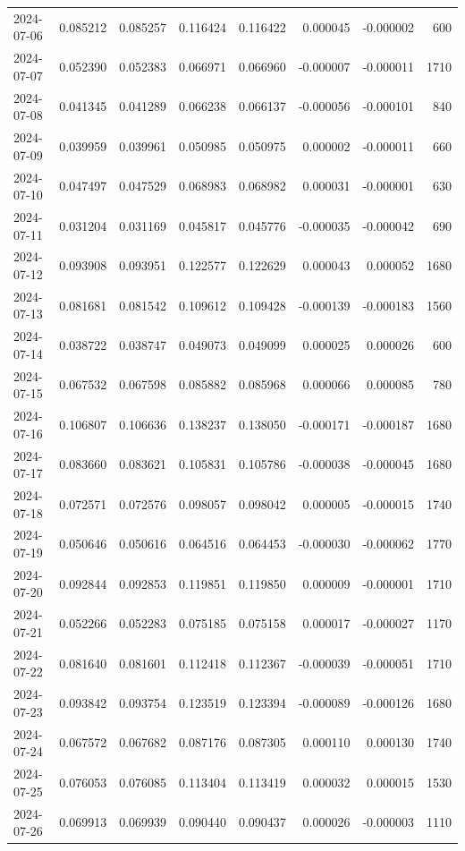 \begin{tabular}{lrrrrrrr}
2024-07-06 & 0.085212 & 0.085257 & 0.116424 & 0.116422 & 0.000045 & -0.000002 & 600 \\
2024-07-07 & 0.052390 & 0.052383 & 0.066971 & 0.066960 & -0.000007 & -0.000011 & 1710 \\
2024-07-08 & 0.041345 & 0.041289 & 0.066238 & 0.066137 & -0.000056 & -0.000101 & 840 \\
2024-07-09 & 0.039959 & 0.039961 & 0.050985 & 0.050975 & 0.000002 & -0.000011 & 660 \\
2024-07-10 & 0.047497 & 0.047529 & 0.068983 & 0.068982 & 0.000031 & -0.000001 & 630 \\
2024-07-11 & 0.031204 & 0.031169 & 0.045817 & 0.045776 & -0.000035 & -0.000042 & 690 \\
2024-07-12 & 0.093908 & 0.093951 & 0.122577 & 0.122629 & 0.000043 & 0.000052 & 1680 \\
2024-07-13 & 0.081681 & 0.081542 & 0.109612 & 0.109428 & -0.000139 & -0.000183 & 1560 \\
2024-07-14 & 0.038722 & 0.038747 & 0.049073 & 0.049099 & 0.000025 & 0.000026 & 600 \\
2024-07-15 & 0.067532 & 0.067598 & 0.085882 & 0.085968 & 0.000066 & 0.000085 & 780 \\
2024-07-16 & 0.106807 & 0.106636 & 0.138237 & 0.138050 & -0.000171 & -0.000187 & 1680 \\
2024-07-17 & 0.083660 & 0.083621 & 0.105831 & 0.105786 & -0.000038 & -0.000045 & 1680 \\
2024-07-18 & 0.072571 & 0.072576 & 0.098057 & 0.098042 & 0.000005 & -0.000015 & 1740 \\
2024-07-19 & 0.050646 & 0.050616 & 0.064516 & 0.064453 & -0.000030 & -0.000062 & 1770 \\
2024-07-20 & 0.092844 & 0.092853 & 0.119851 & 0.119850 & 0.000009 & -0.000001 & 1710 \\
2024-07-21 & 0.052266 & 0.052283 & 0.075185 & 0.075158 & 0.000017 & -0.000027 & 1170 \\
2024-07-22 & 0.081640 & 0.081601 & 0.112418 & 0.112367 & -0.000039 & -0.000051 & 1710 \\
2024-07-23 & 0.093842 & 0.093754 & 0.123519 & 0.123394 & -0.000089 & -0.000126 & 1680 \\
2024-07-24 & 0.067572 & 0.067682 & 0.087176 & 0.087305 & 0.000110 & 0.000130 & 1740 \\
2024-07-25 & 0.076053 & 0.076085 & 0.113404 & 0.113419 & 0.000032 & 0.000015 & 1530 \\
2024-07-26 & 0.069913 & 0.069939 & 0.090440 & 0.090437 & 0.000026 & -0.000003 & 1110 \\

\end{tabular}
